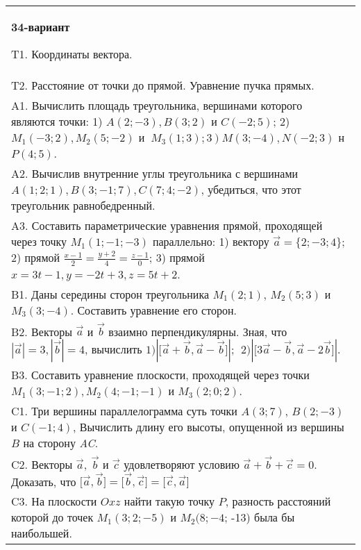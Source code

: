 \documentclass{article}
\begin{document}
\begin{tabular}{m{17cm}}
\textbf{34-вариант}
\newline

T1. 
Координаты вектора.
 \\
T2. 
Расстояние от точки до прямой. Уравнение пучка прямых.
 \\
A1. 
Вычислить площадь треугольника, вершинами которого являются точки: 1) \(A(2; - 3),B(3;2)\) и \(C( - 2;5)\); 2) \(M_{1}( - 3;2),M_{2}(5; - 2)\) и \(\left. \ M_{3}(1;3);3 \right)M(3; - 4),N( - 2;3)\) н \(P(4;5)\).
 \\
A2. 
Вычислив внутренние углы треугольника с вершинами \(A(1;2;1),B(3; - 1;7),C(7;4; - 2)\), убедиться, что этот треугольник равнобедренный.
 \\
A3. 
Составить параметрические уравнения прямой, проходящей через точку \(M_{1}(1; - 1; - 3)\) параллельно: 1) вектору \(\overrightarrow{a} = \{ 2; - 3;4\}\); 2) прямой \(\frac{x - 1}{2} = \frac{y + 2}{4} = \frac{z - 1}{0}\); 3) прямой \(x = 3t - 1,y = - 2t + 3,z = 5t + 2\).
 \\
B1. 
Даны середины сторон треугольника \(M_{1}(2;1)\), \(M_{2}(5;3)\) и \(M_{3}(3; - 4)\). Составить уравнение его сторон.
 \\
B2. 
Векторы \(\overrightarrow{a}\) и \(\overrightarrow{b}\) взаимно перпендикулярны. Зная, что \(|\overrightarrow{a}| = 3,|\overrightarrow{b}| = 4\), вычислить \(1)|\lbrack\overrightarrow{a} + \overrightarrow{b},\overrightarrow{a} - \overrightarrow{b}\rbrack|;\ \ 2)|\lbrack 3\overrightarrow{a} - \overrightarrow{b},\overrightarrow{a} - 2\overrightarrow{b}\rbrack|\).
 \\
B3. 
Составить уравнение плоскости, проходящей через точки \(M_{1}(3; - 1;2),M_{2}(4; - 1; - 1)\) и \(M_{3}(2;0;2)\).
 \\
C1. 
Три вершины параллелограмма суть точки \(A(3;7)\), \(B(2; - 3)\) и \(C( - 1;4)\), Вычислить длину его высоты, опущенной из вершины \(B\) на сторону \emph{AC}.
 \\
C2. 
Векторы \(\overrightarrow{a},\ \overrightarrow{b}\) и \(\overrightarrow{c}\) удовлетворяют условию \(\overrightarrow{a} + \overrightarrow{b} + \overrightarrow{c} = 0\). Доказать, что \(\lbrack\overrightarrow{a},\overrightarrow{b}\rbrack = \lbrack\overrightarrow{b},\overrightarrow{c}\rbrack = \lbrack\overrightarrow{c},\overrightarrow{a}\rbrack\)
 \\
C3. 
На плоскости \(Oxz\) найти такую точку \(P\), разность расстояний которой до точек \(M_{1}(3;2; - 5)\) и \(M_{2}(8; - 4\); -13) была бы наибольшей.
 \\

\end{tabular}
\vspace{1cm}
\end{document}
